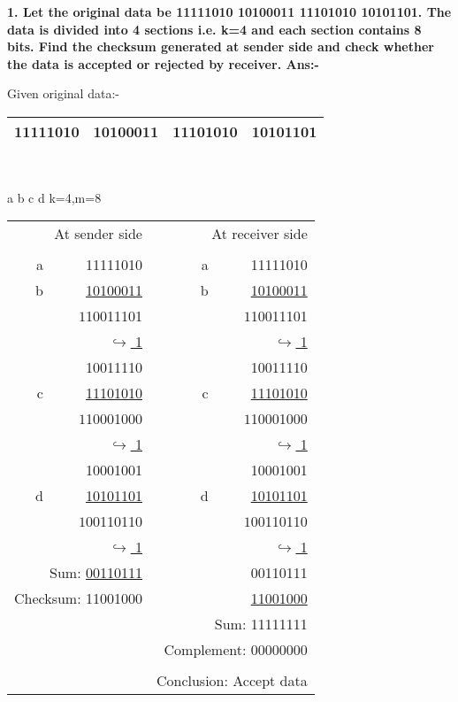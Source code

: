 \documentclass[12pt,a4paper]{article}
\begin{document}
   \textbf{ 1. Let the original data be 11111010                10100011    11101010 10101101. The data is divided into 4 sections i.e. k=4 and each section contains 8 bits. Find the checksum generated at sender side and check whether the data is accepted or rejected by receiver.
    \vskip 12pt
Ans:- }
    \begin{center}
    Given original data:- 
     \begin{tabular}{ | c | c | c | c| }
      \hline 11111010 & 10100011 & 11101010 & 10101101\\ \hline
      \end{tabular}\\
    \end{center}
    \hspace{14em}a \hspace{4em}b \hspace{4em}c \hspace{4em}d
    \vskip 12pt   k=4,m=8
    \vskip 20pt
    \setlength{\tabcolsep}{3em}
    \begin{tabular}{ r | r }
      At sender side & At receiver side  \\\\
     a~~~~~~11111010 & a~~~~~~11111010 \\ b~~~~~~\underline{10100011} & b~~~~~~\underline{10100011}  \\ \textcircled{$1$}10011101 & \textcircled{$1$}10011101 \\
      \underline{$\hookrightarrow$ \hspace{10mm} 1}  & \underline{$\hookrightarrow$ \hspace{10mm} 1} \\ 10011110 & 10011110 \\ c~~~~~~\underline{11101010} & c~~~~~~\underline{11101010} \\ \textcircled{$1$}10001000 & \textcircled{$1$}10001000 \\  \underline{$\hookrightarrow$ \hspace{10mm} 1} & \underline{$\hookrightarrow$ \hspace{10mm} 1} \\ 10001001 & 10001001 \\ d~~~~~~\underline{10101101} & d~~~~~~\underline{10101101} \\ \textcircled{$1$}00110110 &  \textcircled{$1$}00110110\\ \underline{$\hookrightarrow$ \hspace{10mm} 1} & \underline{$\hookrightarrow$ \hspace{10mm} 1} \\ Sum: \underline{00110111} &  00110111\\
      Checksum: 11001000 &  \underline{11001000}\\
      & Sum: 11111111\\ & Complement: 00000000\\\\ & Conclusion: Accept data
    \end{tabular}
\end{document}
